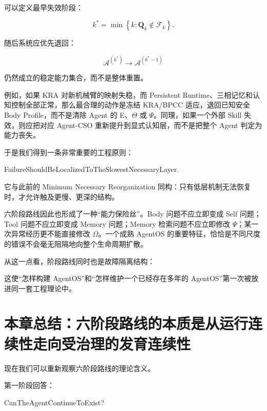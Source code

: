 可以定义最早失效阶段：

\[
k^\ast
=
\min
\left\{
k:
\mathbf Q_k
\notin
\mathcal F_k
\right\}.
\]

随后系统应优先退回：

\[
\mathcal A^{(k^\ast)}
\rightarrow
\mathcal A^{(k^\ast-1)}
\]

仍然成立的稳定能力集合，而不是整体重置。

例如，如果 KRA 对新机械臂的映射失稳，而 Persistent Runtime、三相记忆和认知控制全部正常，那么最合理的动作是冻结 KRA/BPCC 适应，退回已知安全 Body Profile，而不是清除 Agent 的 E、\(\Theta\) 或 \(\Psi\)。同理，如果一个外部 Skill 失效，则应把对应 Agent-CSO 重新提升到显式认知层，而不是把整个 Agent 判定为能力丧失。

于是我们得到一条非常重要的工程原则：

\begin{statementbox}
FailureShouldBeLocalizedToTheSlowestNecessaryLayer.
\end{statementbox}

它与此前的 Minimum Necessary Reorganization 同构：只有低层机制无法恢复时，才允许触及更慢、更深的结构。

六阶段路线因此也形成了一种“能力保险丝”。Body 问题不应立即变成 Self 问题；Tool 问题不应立即变成 Memory 问题；Memory 检索问题不应立即修改 \(\Psi\)；某一次异常经历更不能直接修改 \(\Omega\)。一个成熟 AgentOS 的重要特征，恰恰是不同尺度的错误不会毫无阻隔地向整个生命周期扩散。

从这一点看，阶段路线同时也是故障隔离结构：

\begin{statementbox}
\centering
{}
\end{statementbox}

这使“怎样构建 AgentOS”和“怎样维护一个已经存在多年的 AgentOS”第一次被放进同一套工程理论中。

\section{本章总结：六阶段路线的本质是从运行连续性走向受治理的发育连续性}

现在我们可以重新观察六阶段路线的理论含义。

第一阶段回答：

\begin{statementbox}
CanTheAgentContinueToExist?
\end{statementbox}

